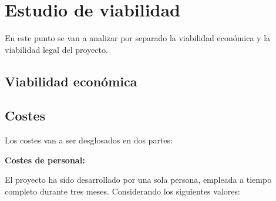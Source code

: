 

\section{Estudio de viabilidad}

En este punto se van a analizar por separado la viabilidad económica y la viabilidad legal del proyecto.

\subsection{Viabilidad económica}

\subsection{Costes}\label{costes}

Los costes van a ser desglosados en dos partes:

\textbf{Costes de personal:}

El proyecto ha sido desarrollado por una sola persona, empleada a tiempo completo durante tres meses. Considerando los siguientes valores:


